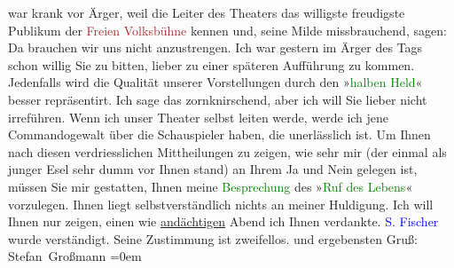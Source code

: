                war krank vor Ärger, weil die Leiter des Theaters das willigste  freudigste Publikum der \textcolor{brown}{Freien Volksbühne}{}\ledrightnote{\textcolor{brown}{Wiener Freie Volksbühne}} kennen und, seine Milde missbrauchend, sagen: Da brauchen
               wir uns nicht anzustrengen.\pend
           \pstart
           {\pb}Ich war gestern im Ärger des Tags schon
               willig Sie zu bitten, lieber zu einer späteren Aufführung zu kommen. Jedenfalls wird
               die Qualität unserer Vorstellungen durch den »\textcolor{green}{halben
                  Held}{}\ledrightnote{\textcolor{green}{Ein halber Held. Tragödie}}« besser repräsentirt.\pend
           \pstart
           Ich sage das zornknirschend, aber ich will Sie lieber nicht irreführen. Wenn ich
               unser Theater selbst leiten werde, werde ich jene {\pb}Commandogewalt über die Schauspieler haben,
               die unerlässlich ist.\pend
           \pstart
           Um Ihnen nach diesen verdriesslichen Mittheilungen zu zeigen, wie sehr mir (der
               einmal als junger Esel sehr dumm vor Ihnen stand) an Ihrem Ja und Nein gelegen ist,
               müssen Sie mir gestatten, Ihnen meine \textcolor{green}{Besprechung}{} des »\textcolor{green}{Ruf des Lebens}{}\ledrightnote{\textcolor{green}{Der Ruf des Lebens. Schauspiel in drei Akten}}«
               vorzulegen. Ihnen liegt selbstverständlich nichts an {\pb}meiner Huldigung. Ich will Ihnen nur zeigen,
               einen wie \uline{andächtigen} Abend ich Ihnen verdankte.\pend
           \pstart
           \textcolor{blue}{S. Fischer}{}\ledrightnote{\textcolor{blue}{Samuel Fischer}} wurde verständigt. Seine Zustimmung
               ist zweifellos.\pend
           \pstart
            und ergebensten Gruß:{\\[\baselineskip]}\spacefill\mbox{Stefan
                  Großmann}\pend
           \leftskip=0em{}\endnumbering{}  
      